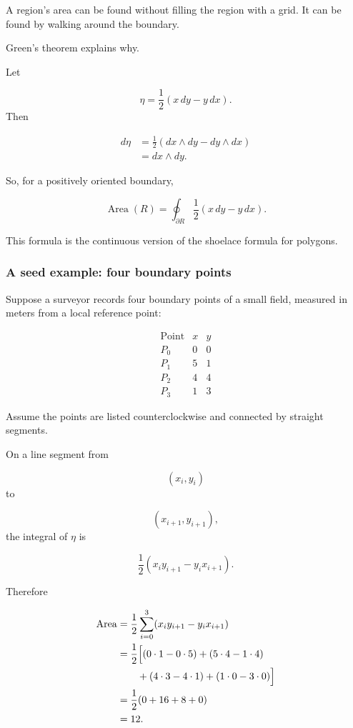A region's area can be found without filling the region with a grid.  It can be found by
walking around the boundary.

Green's theorem explains why.

Let

\[
    \eta=\frac12(x\,dy-y\,dx).
\]
Then

\[
\begin{aligned}
d\eta
&=
\frac12(dx\wedge dy-dy\wedge dx)\\
&=
dx\wedge dy.
\end{aligned}
\]

So, for a positively oriented boundary,

\[
\boxed{
    \operatorname{Area}(R)
    =
    \oint_{\partial R}\frac12(x\,dy-y\,dx).
}
\]

This formula is the continuous version of the shoelace formula for polygons.

\subsubsection*{A seed example: four boundary points}

Suppose a surveyor records four boundary points of a small field, measured in meters
from a local reference point:

\[
\begin{array}{c|cc}
\text{Point} & x & y \\ \hline
P_0 & 0 & 0\\
P_1 & 5 & 1\\
P_2 & 4 & 4\\
P_3 & 1 & 3
\end{array}
\]

Assume the points are listed counterclockwise and connected by straight segments.

On a line segment from

\[
    (x_i,y_i)
\]
to

\[
    (x_{i+1},y_{i+1}),
\]
the integral of \(\eta\) is

\[
\boxed{
    \frac12(x_i y_{i+1}-y_i x_{i+1}).
}
\]

Therefore

\[
\begin{aligned}
\operatorname{Area}
&=
\frac12\sum_{i=0}^{3}
(x_i y_{i+1}-y_i x_{i+1})\\
&=
\frac12\Bigl[
(0\cdot1-0\cdot5)
+
(5\cdot4-1\cdot4)\\
&\qquad
+
(4\cdot3-4\cdot1)
+
(1\cdot0-3\cdot0)
\Bigr]\\
&=
\frac12(0+16+8+0)\\
&=
12.
\end{aligned}
\]

